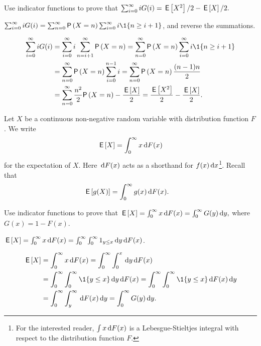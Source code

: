 \begin{exercise}\label{ex:66}
 Use indicator functions to prove that
$\sum_{i=0}^\infty i G(i) =  \,\mathsf{E}\left[X^2\right]/2 - \,\mathsf{E}\left[X\right]/2.$
\begin{hint}
$\sum_{i=0}^\infty i G(i) = \sum_{n=0}^\infty \P{X=n} \sum_{i=0}^\infty i \1{n\geq i+1}$,
and reverse the summations.
\end{hint}
\begin{solution}
\begin{align*}
\sum_{i=0}^\infty i G(i)
&= \sum_{i=0}^\infty i \sum_{n=i+1}^\infty \P{X=n} = \sum_{n=0}^\infty \P{X=n} \sum_{i=0}^\infty i \1{n\geq i+1} \\
&= \sum_{n=0}^\infty \P{X=n} \sum_{i=0}^{n-1}i  = \sum_{n=0}^\infty \P{X=n} \frac{(n-1)n}{2} \\
&= \sum_{n=0}^\infty  \frac{n^2}{2} \P{X=n} - \frac{\E X}{2}
= \frac{\E{X^2}}{2} - \frac{\E X}{2}.
\end{align*}
\end{solution}
\end{exercise}



Let $X$ be a continuous non-negative random variable with distribution function $F$.  We write 
\begin{equation*}
  \,\mathsf{E}\left[X\right] = \int_0^\infty x \,\text{d}F(x)
\end{equation*}
for the expectation of $X$. Here $\,\text{d}F(x)$ acts as a shorthand for $f(x) \,\text{d}x$\footnote{For the interested reader, $\int x \,\text{d}F(x)$ is a Lebesgue-Stieltjes integral with respect to the distribution function $F$.}. Recall that
\begin{align*}
\,\mathsf{E}\left[g(X)\right] &= \int_0^\infty g(x) \,\text{d}F(x).
\end{align*}



\begin{exercise}
 Use indicator functions to prove that 
$   \,\mathsf{E}\left[X\right] = \int_0^\infty x \,\text{d}F(x)  = \int_0^\infty G(y) \,\text{d}y,$
where $G(x) = 1 - F(x)$. 
\begin{hint}
$\,\mathsf{E}\left[X\right] = \int_0^\infty x \,\text{d}F(x)  = \int_0^\infty \int_0^\infty 1_{y\leq x} \,\text{d}y \,\text{d}F(x)$.
\end{hint}
\begin{solution}
  \begin{align*}
    \E{X} &= \int_0^\infty x \d F(x)  = \int_0^\infty \int_0^x \d y \d F(x) \\
    & = \int_0^\infty \int_0^\infty \1{y\leq x} \d y \d F(x)   = \int_0^\infty \int_0^\infty \1{y\leq x} \d F(x) \d y\\
    & = \int_0^\infty \int_y^\infty \d F(x) \d y = \int_0^\infty G(y) \d y.
  \end{align*}
\end{solution}
\end{exercise}

